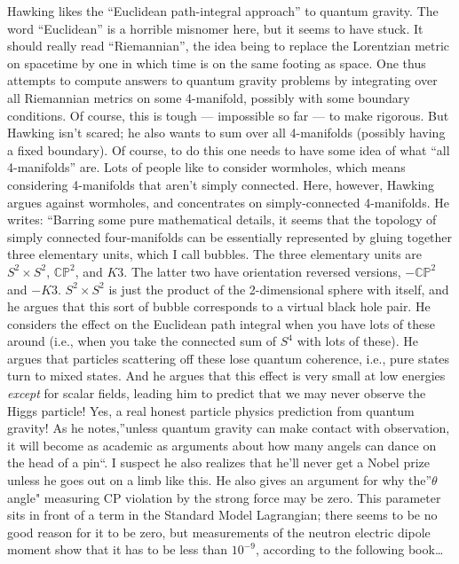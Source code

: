 \documentclass{article}
\def\tightlist{}
\renewcommand{\texttt}[1]{%
  \begingroup
  \ttfamily
  \begingroup\lccode`~=`/\lowercase{\endgroup\def~}{/\discretionary{}{}{}}%
  \begingroup\lccode`~=`[\lowercase{\endgroup\def~}{[\discretionary{}{}{}}%
  \begingroup\lccode`~=`.\lowercase{\endgroup\def~}{.\discretionary{}{}{}}%
  \catcode`/=\active\catcode`[=\active\catcode`.=\active
  \scantokens{#1\noexpand}%
  \endgroup
}
\begin{document}

Hawking likes the ``Euclidean path-integral approach'' to quantum
gravity. The word ``Euclidean'' is a horrible misnomer here, but it
seems to have stuck. It should really read ``Riemannian'', the idea
being to replace the Lorentzian metric on spacetime by one in which time
is on the same footing as space. One thus attempts to compute answers to
quantum gravity problems by integrating over all Riemannian metrics on
some 4-manifold, possibly with some boundary conditions. Of course, this
is tough --- impossible so far --- to make rigorous. But Hawking isn't
scared; he also wants to sum over all 4-manifolds (possibly having a
fixed boundary). Of course, to do this one needs to have some idea of
what ``all 4-manifolds'' are. Lots of people like to consider wormholes,
which means considering 4-manifolds that aren't simply connected. Here,
however, Hawking argues against wormholes, and concentrates on
simply-connected 4-manifolds. He writes: ``Barring some pure
mathematical details, it seems that the topology of simply connected
four-manifolds can be essentially represented by gluing together three
elementary units, which I call bubbles. The three elementary units are
\(S^2 \times S^2\), \(\mathbb{CP}^2\), and \(K3\). The latter two have
orientation reversed versions, \(-\mathbb{CP}^2\) and \(-K3\).
\(S^2 \times S^2\) is just the product of the 2-dimensional sphere with
itself, and he argues that this sort of bubble corresponds to a virtual
black hole pair. He considers the effect on the Euclidean path integral
when you have lots of these around (i.e., when you take the connected
sum of \(S^4\) with lots of these). He argues that particles scattering
off these lose quantum coherence, i.e., pure states turn to mixed
states. And he argues that this effect is very small at low energies
\emph{except} for scalar fields, leading him to predict that we may
never observe the Higgs particle! Yes, a real honest particle physics
prediction from quantum gravity! As he notes,''unless quantum gravity
can make contact with observation, it will become as academic as
arguments about how many angels can dance on the head of a pin``. I
suspect he also realizes that he'll never get a Nobel prize unless he
goes out on a limb like this. He also gives an argument for why
the''\(\theta\) angle" measuring CP violation by the strong force may be
zero. This parameter sits in front of a term in the Standard Model
Lagrangian; there seems to be no good reason for it to be zero, but
measurements of the neutron electric dipole moment show that it has to
be less than \(10^{-9}\), according to the following book\ldots{}
\end{document}
